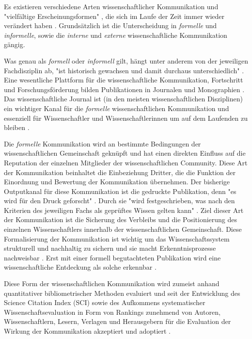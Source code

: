 Es existieren verschiedene Arten wissenschaftlicher Kommunikation und "vielfältige Erscheinungsformen" \cite{graefen2007_wissenschaftliche_artikel}, die sich im Laufe der Zeit immer wieder verändert haben \cite{Konneker_2013}. Grundsätzlich ist die Unterscheidung in \textit{formelle} und \textit{informelle}, sowie die \textit{interne} und \textit{externe} wissenschaftliche Kommunikation gängig.

Was genau als \textit{formell} oder \textit{informell} gilt, hängt unter anderem von der jeweiligen Fachdisziplin ab, "ist historisch gewachsen und damit durchaus unterschiedlich" \cite{Hanekop_2014}. Eine wesentliche Plattform für die wissenschaftliche Kommunikation, Fortschritt und Forschungsförderung bilden Publikationen in Journalen und Monographien \cite{cope2014future} \cite{fox_1983_publication}. Das wissenschaftliche Journal ist (in den meisten wissenschaftlichen Disziplinen) ein wichtiger Kanal für die \textit{formelle} wissenschaftlichen Kommunikation und essenziell für Wissenschaftler und Wissenschaftlerinnen um auf dem Laufenden zu bleiben \cite{cope2014future}.

Die \textit{formelle} Kommunikation wird an bestimmte Bedingungen der wissenschaftlichen Gemeinschaft geknüpft und hat einen direkten Einfluss auf die Reputation der einzelnen Mitglieder der wissenschaftlichen Community. Diese Art der Kommunikation beinhaltet die Einbeziehung Dritter, die die Funktion der Einordnung und Bewertung der Kommunikation übernehmen. Der bisherige Outputkanal für diese Kommunikation ist die gedruckte Publikation, denn "es wird für den Druck geforscht" \cite{luhmann_1997_gesellschaft}. Durch sie "wird festgeschrieben, was nach den Kriterien des jeweiligen Fachs als geprüftes Wissen gelten kann" \cite{bbaw_publizieren_2015}. Ziel dieser Art der Kommunikation ist die Sicherung des Verbleibs und die Positionierung des einzelnen Wissenschaftlers innerhalb der wissenschaftlichen Gemeinschaft. Diese Formalisierung der Kommunikation ist wichtig um das Wissenschaftssystem strukturell und nachhaltig zu sichern und sie macht Erkenntnisprozesse nachweisbar \cite{kaden_2009_library}. Erst mit einer formell begutachteten Publikation wird eine wissenschaftliche Entdeckung als solche erkennbar \cite{brembs2015open}.

Diese Form der wissenschaftlichen Kommunikation wird zumeist anhand quantitativer bibliometrischer Methoden evaluiert und seit der Entwicklung des Science Citation Index (SCI) sowie des Aufkommens systematischer Wissenschaftsevaluation in Form von Rankings zunehmend von Autoren, Wissenschaftlern, Lesern, Verlagen und Herausgebern für die Evaluation der Wirkung der Kommunikation akzeptiert und adoptiert \cite[:2]{haustein_2012_multidimensional}.


